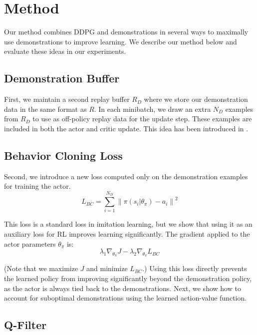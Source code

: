 \documentclass[letterpaper, 10 pt, conference]{ieeeconf}  %
\newcommand\norm[1]{\left\lVert#1\right\rVert}
\begin{document}
\section{Method} \label{sec:method}

Our method combines DDPG and demonstrations in several ways to maximally use demonstrations to improve learning. We describe our method below and evaluate these ideas in our experiments.

\subsection{Demonstration Buffer} 

First, we maintain a second replay buffer $R_D$ where we store our demonstration data in the same format as $R$. In each minibatch, we draw an extra $N_D$ examples from $R_D$ to use as off-policy replay data for the update step. These examples are included in both the actor and critic update. This idea has been introduced in \cite{vecerik17ddpgfd}.

\subsection{Behavior Cloning Loss}

Second, we introduce a new loss computed only on the demonstration examples for training the actor.
\begin{equation}\label{eq:BC}
    L_{BC} = \sum_{i=1}^{N_D} \norm{\pi(s_i|\theta_\pi) - a_i}^2
\end{equation}

\noindent This loss is a standard loss in imitation learning, but we show that using it as an auxiliary loss for RL improves learning significantly. The gradient applied to the actor parameters $\theta_\pi$ is:
\begin{equation} \label{eqn:aux}
    \lambda_1 \nabla_{\theta_\pi} J - \lambda_2 \nabla_{\theta_\pi} L_{BC}
\end{equation}

\noindent (Note that we maximize $J$ and minimize $L_{BC}$.) Using this loss directly prevents the learned policy from improving significantly beyond the demonstration policy, as the actor is always tied back to the demonstrations. Next, we show how to account for suboptimal demonstrations using the learned action-value function.

\subsection{Q-Filter}\label{sec:ours}
\end{document}
